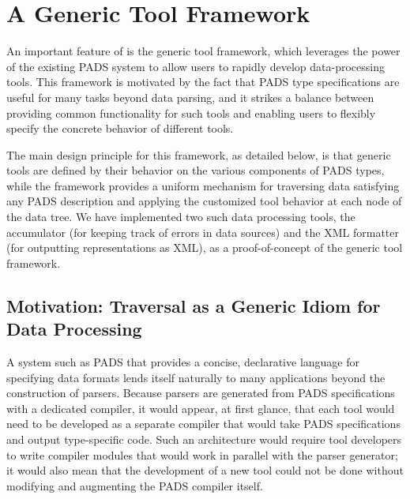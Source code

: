\section{A Generic Tool Framework}
\label{sec:gen-tool}
An important feature of \padsml{} is the generic tool framework, which leverages the power of the existing PADS system to allow users to rapidly develop data-processing tools. This framework is motivated by the fact that PADS type specifications are useful for many tasks beyond data parsing, and it strikes a balance between providing common functionality for such tools and enabling users to flexibly specify the concrete behavior of different tools.

The main design principle for this framework, as detailed below, is that generic tools are defined by their behavior on the various components of PADS types, while the framework provides a uniform mechanism for traversing data satisfying any PADS description and applying the customized tool behavior at each node of the data tree. We have implemented two such data processing tools, the accumulator (for keeping track of errors in data sources) and the XML formatter (for outputting \pads{} representations as XML), as a proof-of-concept of the generic tool framework.

\subsection{Motivation: Traversal as a Generic Idiom for Data Processing}
\label{sec:gentool-motivation}
A system such as PADS that provides a concise, declarative language for specifying data formats lends itself naturally to many applications beyond the construction of parsers. Because parsers are generated from PADS specifications with a dedicated compiler, it would appear, at first glance, that each tool would need to be developed as a separate compiler that would take PADS specifications and output type-specific code. Such an architecture would require tool developers to write compiler modules that would work in parallel with the parser generator; it would also mean that the development of a new tool could not be done without modifying and augmenting the PADS compiler itself.


